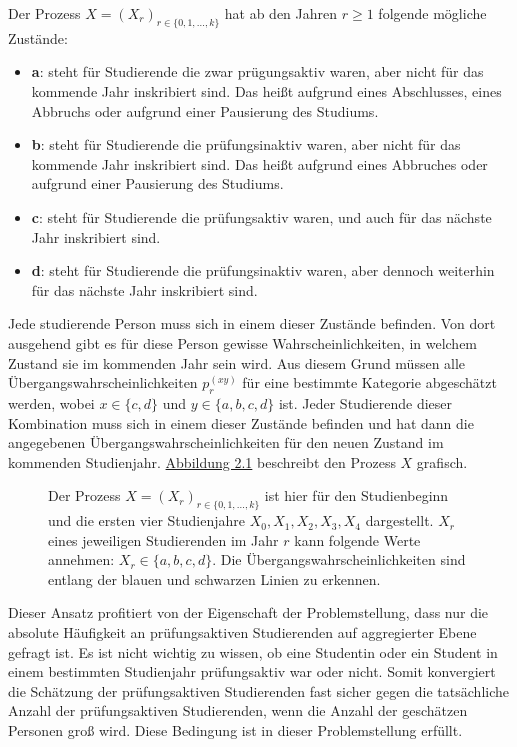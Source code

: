 Der Prozess $X = (X_r)_{r \in \{ 0,1, \dots, k \} }$ hat ab den Jahren $r \geq 1$ folgende m\"ogliche Zust\"ande:
\begin{itemize}
  \item \textbf{a}: steht f\"ur Studierende die zwar pr\"ugungsaktiv waren, aber nicht f\"ur das kommende Jahr inskribiert sind. Das hei{\ss}t aufgrund eines Abschlusses, eines Abbruchs oder aufgrund einer Pausierung des Studiums.
  \item \textbf{b}: steht f\"ur Studierende die pr\"ufungsinaktiv waren, aber nicht f\"ur das kommende Jahr inskribiert sind. Das hei{\ss}t aufgrund eines Abbruches oder aufgrund einer Pausierung des Studiums.
  \item \textbf{c}: steht f\"ur Studierende die pr\"ufungsaktiv waren, und auch f\"ur das n\"achste Jahr inskribiert sind.
  \item \textbf{d}: steht f\"ur Studierende die pr\"ufungsinaktiv waren, aber dennoch weiterhin f\"ur das n\"achste Jahr inskribiert sind.
\end{itemize}

Jede studierende Person muss sich in einem dieser Zust\"ande befinden. Von dort ausgehend gibt es f\"ur diese Person gewisse Wahrscheinlichkeiten,
in welchem Zustand sie im kommenden Jahr sein wird.
Aus diesem Grund müssen alle Übergangswahrscheinlichkeiten $p_r^{(xy)}$ f\"ur eine bestimmte Kategorie
abgeschätzt werden, wobei $x \in \{c, d \}$ und $y \in \{a, b, c, d\}$ ist.
Jeder Studierende dieser Kombination muss sich in einem dieser Zustände befinden und hat dann die
angegebenen Übergangswahrscheinlichkeiten für den neuen Zustand im kommenden Studienjahr. \hyperref[fig:prozess]{ Abbildung 2.1} beschreibt den Prozess $X$ grafisch.

\begin{figure}[ht]
  \label{fig:prozess}
  \begin{center}
  \end{center}
  \caption[Grafische Darstellung des zweiten Modells]
  {Der Prozess $X = (X_r)_{r \in \{ 0,1, \dots, k \} }$ ist hier für den Studienbeginn und die ersten vier Studienjahre $X_0, X_1, X_2, X_3, X_4$ dargestellt.
    $X_r$ eines jeweiligen Studierenden im Jahr $r$ kann folgende Werte annehmen: $X_r \in \{a, b, c, d\}$.
    Die Übergangswahrscheinlichkeiten sind entlang der blauen und schwarzen Linien zu erkennen.}
\end{figure}

Dieser Ansatz profitiert von der Eigenschaft der Problemstellung, dass nur die absolute H\"aufigkeit an pr\"ufungsaktiven Studierenden auf aggregierter Ebene
gefragt ist. Es ist nicht wichtig zu wissen, ob eine Studentin oder ein Student in einem bestimmten Studienjahr pr\"ufungsaktiv war oder nicht.
Somit konvergiert die Sch\"atzung der pr\"ufungsaktiven Studierenden
fast sicher gegen die tats\"achliche Anzahl der pr\"ufungsaktiven Studierenden, wenn die Anzahl der gesch\"atzen Personen gro{\ss} wird. Diese Bedingung ist in dieser Problemstellung
erf\"ullt.

